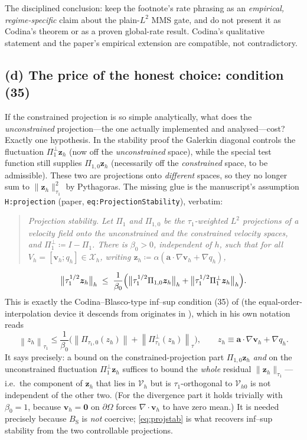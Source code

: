 \documentclass[11pt]{article}
\newcommand{\bv}{\boldsymbol{v}}
\newcommand{\ba}{\boldsymbol{a}}
\newcommand{\bz}{\boldsymbol{z}}
\newcommand{\bzero}{\boldsymbol{0}}
\newcommand{\grad}{\nabla}
\newcommand{\divg}{\nabla\!\cdot\!}
\newcommand{\norm}[1]{\left\lVert #1 \right\rVert}
\newcommand{\Vh}{\mathcal{V}_{h}}
\newcommand{\Vhz}{\mathcal{V}_{h0}}
\newcommand{\Ponez}{\Pi_{1,0}}
\newcommand{\Poneperp}{\Pi_{1}^{\perp}}
\newcommand{\normtau}[1]{\lVert #1 \rVert_{\tau_{1}}}
\theoremstyle{plain}
\theoremstyle{definition}
\theoremstyle{remark}
\begin{document}
The disciplined conclusion: keep the footnote's rate phrasing as an
\emph{empirical, regime-specific} claim about the plain-$L^2$ MMS gate,
and do not present it as Codina's theorem or as a proven global-rate
result. Codina's qualitative statement and the paper's empirical
extension are compatible, not contradictory.

\subsection{(d) The price of the honest choice: condition (35)}

If the constrained projection is so simple analytically, what does the
\emph{unconstrained} projection---the one actually implemented and
analysed---cost? Exactly one hypothesis. In the stability proof the
Galerkin diagonal controls the fluctuation $\Poneperp\bz_h$ (now off the
\emph{unconstrained} space), while the special test function still
supplies $\Ponez\bz_h$ (necessarily off the \emph{constrained} space,
to be admissible). These two are projections onto \emph{different}
spaces, so they no longer sum to $\normtau{\bz_h}^2$ by Pythagoras. The
missing glue is the manuscript's assumption \texttt{H:projection}
(paper, \texttt{eq:ProjectionStability}), verbatim:

\begin{quote}\itshape
\emph{Projection stability.} Let $\Pi_1$ and $\Pi_{1,0}$ be the
$\tau_1$-weighted $L^2$ projections of a velocity field onto the
unconstrained and the constrained velocity spaces, and
$\Pi_1^{\perp}\coloneqq I-\Pi_1$. There is $\beta_0>0$, independent of
$h$, such that for all $V_h=[\bm v_h;q_h]\in\mathcal X_h$, writing
$\bm z_h\coloneqq\alpha(\bm a\cdot\nabla\bm v_h+\nabla q_h)$,
\end{quote}
\begin{equation}\label{eq:projstab}
  \bigl\lVert\tau_1^{1/2}\bm z_h\bigr\rVert_h
  \;\le\;\frac{1}{\beta_0}\Bigl(
    \bigl\lVert\tau_1^{1/2}\Pi_{1,0}\bm z_h\bigr\rVert_h
    +\bigl\lVert\tau_1^{1/2}\Pi_1^{\perp}\bm z_h\bigr\rVert_h\Bigr).
\end{equation}
This is exactly the Codina--Blasco-type inf--sup condition (35) of
\cite{codina2008} (the equal-order-interpolation device it descends from
originates in \cite{codinablasco1997}), which in his own notation reads
\[
  \norm{z_h}_{\tau_1}\le\frac{1}{\beta_0}
  \bigl(\norm{\Pi_{\tau_1,0}(z_h)}+\norm{\Pi_{\tau_1}^{\perp}(z_h)}_\tau\bigr),
  \qquad z_h\equiv\ba\cdot\grad\bv_h+\grad q_h .
\]
It says precisely: a bound on the constrained-projection part
$\Ponez\bz_h$ \emph{and} on the unconstrained fluctuation
$\Poneperp\bz_h$ suffices to bound the \emph{whole} residual
$\normtau{\bz_h}$---i.e.\ the component of $\bz_h$ that lies in $\Vh$ but
is $\tau_1$-orthogonal to $\Vhz$ is not independent of the other two.
(For the divergence part it holds trivially with $\beta_0=1$, because
$\bv_h=\bzero$ on $\partial\Omega$ forces $\divg\bv_h$ to have zero
mean.) It is needed precisely because $B_{\mathrm S}$ is \emph{not}
coercive; \cref{eq:projstab} is what recovers inf--sup stability from the
two controllable projections.
\end{document}
